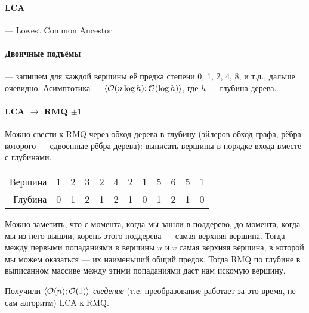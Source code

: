 \paragraph{LCA}
--- Lowest Common Ancestor.

\paragraph{Двоичные подъёмы}
--- запишем для каждой вершины
её предка степени 0, 1, 2, 4, 8, и т.д., дальше очевидно.
Асимптотика --- $\langle \mathcal{O}(n \log h); \mathcal{O}(\log h) \rangle$,
где $h$ --- глубина дерева.

\paragraph{LCA $\to$ RMQ $\pm 1$}
Можно свести к RMQ через обход дерева в глубину
(эйлеров обход графа, рёбра которого --- сдвоенные рёбра дерева):
выписать вершины в порядке входа вместе с глубинами.

\begin{center}

    \bigskip

    \begin{tabular}{r|ccccccccccc|}
        Вершина & 1 & 2 & 3 & 2 & 4 & 2 & 1 & 5 & 6 & 5 & 1 \\
        Глубина & 0 & 1 & 2 & 1 & 2 & 1 & 0 & 1 & 2 & 1 & 0 \\
    \end{tabular}
\end{center}

Можно заметить, что с момента, когда мы зашли в поддерево,
до момента, когда мы из него вышли, корень этого поддерева
--- самая верхняя вершина.
Тогда между первыми попаданиями в вершины $u$ и $v$
самая верхняя вершина, в которой мы можем оказаться
--- их наименьший общий предок.
Тогда RMQ по глубине в выписанном массиве между этими попаданиями
даст нам искомую вершину.

Получили $\langle \mathcal{O}(n); \mathcal{O}(1) \rangle$-\emph{сведение}
(т.е. преобразование работает за это время, не сам алгоритм)
LCA к RMQ.

